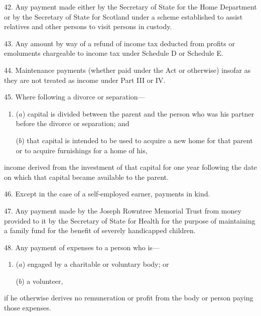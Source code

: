 \documentclass[12pt,a4paper]{article}
\begin{document}
\medskip

42.  Any payment made either by the Secretary of State for the Home Department or by the Secretary of State for Scotland under a scheme established to assist relatives and other persons to visit persons in custody.

\medskip

43.  Any amount by way of a refund of income tax deducted from profits or emoluments chargeable to income tax under Schedule D or Schedule E.

\medskip

44.  Maintenance payments (whether paid under the Act or otherwise) insofar as they are not treated as income under Part III or IV.

\medskip

45.  Where following a divorce or separation—
\begin{enumerate}\item[]
($a$) capital is divided between the parent and the person who was his partner before the divorce or separation; and

($b$) that capital is intended to be used to acquire a new home for that parent or to acquire furnishings for a home of his,
\end{enumerate}
income derived from the investment of that capital for one year following the date on which that capital became available to the parent.

\medskip

46.  Except in the case of a self-employed earner, payments in kind.


\medskip

47.  Any payment made by the Joseph Rowntree Memorial Trust from money provided to it by the Secretary of State for Health for the purpose of maintaining a family fund for the benefit of severely handicapped children.

\medskip

48.  Any payment of expenses to a person who is—
\begin{enumerate}\item[]
($a$) engaged by a charitable or voluntary body; or

($b$) a volunteer,
\end{enumerate}
if he otherwise derives no remuneration or profit from the body or person paying those expenses.
\end{document}
